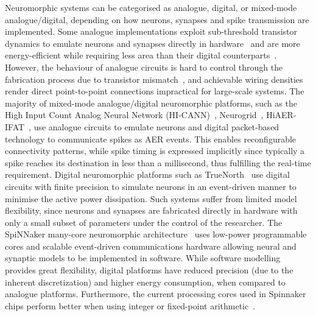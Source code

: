 \documentclass{frontiersENG} %
\begin{document}
Neuromorphic systems can be categorised as analogue, digital, or mixed-mode analogue/digital, depending on how neurons, synapses and spike transmission are implemented. %
Some analogue implementations exploit sub-threshold transistor dynamics to emulate neurons and synapses directly in hardware~\citep{indiveri2011neuromorphic} and are more energy-efficient while requiring less area than their digital counterparts~\citep{joubert2012hardware}. However, the behaviour of analogue circuits is hard to control through the fabrication process due to transistor mismatch~\citep{indiveri2011neuromorphic,pedram2006thermal,linares2003compact}, and achievable wiring densities render direct point-to-point connections impractical for large-scale systems. The majority of mixed-mode analogue/digital neuromorphic platforms, such as the High Input Count Analog Neural Network (HI-CANN)~\citep{schemmel2010wafer}, Neurogrid~\citep{benjamin2014neurogrid}, HiAER-IFAT~\citep{yu201265k}, use analogue circuits to emulate neurons and digital packet-based technology to communicate spikes as AER events. This enables reconfigurable connectivity patterns, while spike timing is expressed implicitly since typically a spike reaches its destination in less than a millisecond, thus fulfilling the real-time requirement. Digital neuromorphic platforms such as TrueNorth~\citep{merolla2014million} use digital circuits with finite precision to simulate neurons in an event-driven manner to minimise the active power dissipation. Such systems suffer from limited model flexibility, since neurons and synapses are fabricated directly in hardware with only a small subset of parameters under the control of the researcher. 
The SpiNNaker many-core neuromorphic architecture~\citep{furber2014spinnaker} uses low-power programmable cores and scalable event-driven communications hardware allowing neural and synaptic models to be implemented in software.
While software modelling provides great flexibility, digital platforms have reduced precision (due to the inherent discretization) and higher energy consumption, when compared to analogue platforms. Furthermore, the current processing cores used in Spinnaker chips perform better when using integer or fixed-point arithmetic~\citep{Hopkins2015Accuracy}.
\end{document}
